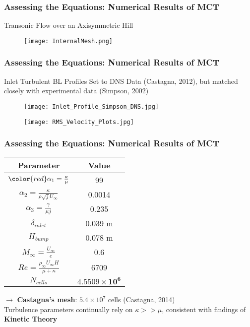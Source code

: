 \documentclass{beamer}
\begin{document}
\begin{frame}
 \frametitle{Assessing the Equations: Numerical Results of MCT}
 Transonic Flow over an Axisymmetric Hill
  \begin{figure}
   \texttt{[image: InternalMesh.png]}
  \end{figure}
 \end{frame}
\begin{frame}
 \frametitle{Assessing the Equations: Numerical Results of MCT}
 Inlet Turbulent BL Profiles Set to DNS Data (Castagna, 2012), but matched 
closely with experimental data (Simpson, 2002)
 \begin{multicols}{2}
  \begin{figure}
   \texttt{[image: Inlet\_Profile\_Simpson\_DNS.jpg]}
  \end{figure}
\begin{figure}
 \texttt{[image: RMS\_Velocity\_Plots.jpg]}
\end{figure}
 \end{multicols}
\end{frame}
 \begin{frame}
 \frametitle{Assessing the Equations: Numerical Results of MCT}
 \begin{table}[h!]
 \begin{tabular}{||c | c||} 
 \hline 
 Parameter & Value \\  [.5ex]
 \hline
 ${\color{red}\alpha_{1} = \frac{\kappa}{\mu}}$ & 99 \\
 $\alpha_{2} = \frac{\kappa}{\rho \sqrt{j}U_{\infty}}$  & 0.0014 \\
 $\alpha_{3} = \frac{\gamma}{\mu j}$ & 0.235 \\  
 $\delta_{inlet}$ & 0.039 m \\
 $H_{bump}$ & 0.078 m \\
 $M_{\infty} = \frac{U_{\infty}}{c} $      & 0.6\\
 $Re = \frac{\rho_{\infty} U_{\infty}H}{\mu + \kappa}$ & 6709\\
 $N_{cells}$ & $\mathbf{4.5509 \times 10^6}$ \\ \hline
 \end{tabular}
\end{table}
\pause
$\rightarrow$ \textbf{Castagna's mesh}: $5.4 \times 
10^7$ cells (Castagna, 2014)\\
\vspace{2mm}
\pause
Turbulence parameters continually rely on $\kappa >> \mu$, consistent with 
findings of \textbf{Kinetic Theory}\\
\end{frame}
\end{document}
